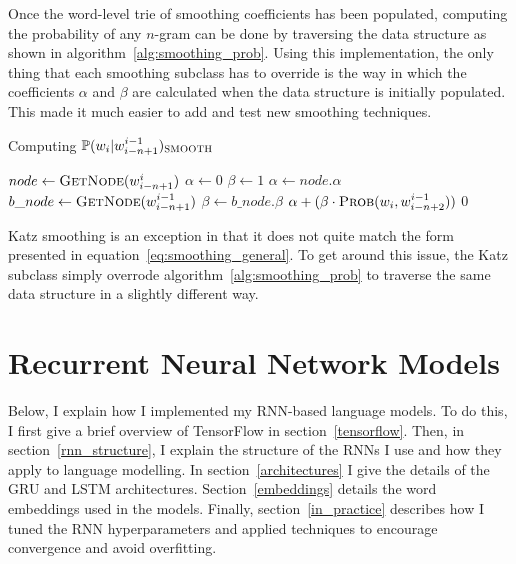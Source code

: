 \documentclass[a4paper, 12pt]{report}
\begin{document}
Once the word-level trie of smoothing coefficients has been populated, computing the probability of any $n$-gram can be done by traversing the data structure as shown in algorithm~\ref{alg:smoothing_prob}. Using this implementation, the only thing that each smoothing subclass has to override is the way in which the coefficients $\alpha$ and $\beta$ are calculated when the data structure is initially populated. This made it much easier to add and test new smoothing techniques.

\begin{algorithm}
\caption{Computing $\mathbb{P}(w_i | w_{i - n + 1}^{i - 1})_{\text{\scshape SMOOTH}}$}
\label{alg:smoothing_prob}
\begin{algorithmic}[1]
	\State $node \gets \text{\scshape GetNode}(w_{i - n + 1}^i)$
	\State $\alpha \gets 0$
	\State $\beta \gets 1$
		\State $\alpha \gets node.\alpha$
	\EndIf
		\State $b\_node \gets \text{\scshape GetNode}(w_{i - n + 1}^{i - 1})$
			\State $\beta \gets b\_node.\beta$
		\EndIf
	\EndIf
	\State \Return $\alpha + (\beta \cdot \text{\scshape Prob}(w_i, w_{i - n + 2}^{i - 1}))$
\EndIf
\State \Return $0$
\EndProcedure
\end{algorithmic}
\end{algorithm}

Katz smoothing is an exception in that it does not quite match the form presented in equation~\ref{eq:smoothing_general}. To get around this issue, the Katz subclass simply overrode algorithm~\ref{alg:smoothing_prob} to traverse the same data structure in a slightly different way.

\section{Recurrent Neural Network Models} \label{rnn_lm}

Below, I explain how I implemented my RNN-based language models. To do this, I first give a brief overview of TensorFlow in section~\ref{tensorflow}. Then, in section~\ref{rnn_structure}, I explain the structure of the RNNs I use and how they apply to language modelling. In section~\ref{architectures} I give the details of the GRU and LSTM architectures. Section~\ref{embeddings} details the word embeddings used in the models. Finally, section~\ref{in_practice} describes how I tuned the RNN hyperparameters and applied techniques to encourage convergence and avoid overfitting.
\end{document}
